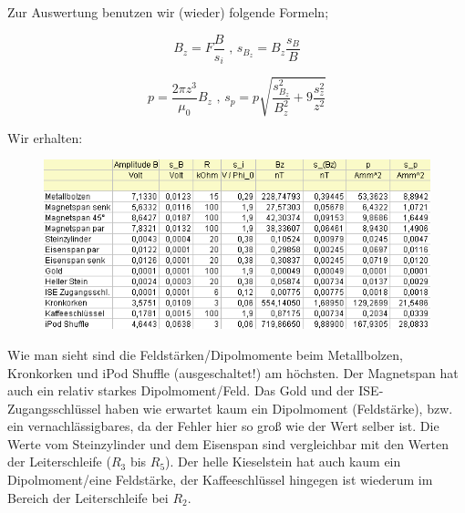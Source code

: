 Zur Auswertung benutzen wir (wieder) folgende Formeln;

$$ B_z = F\frac{B}{s_i} \text{ \ \ , \ \ } s_{B_z} = B_z\frac{s_B}{B}$$

$$ p = \frac{2\pi z^3}{\mu_0}B_z \text{ \ \ , \ \ } s_p = p\sqrt{\frac{s_{B_z}^2}{B_z^2} + 9\frac{s_z^2}{z^2}} $$

Wir erhalten:

\begin{figure}[H]
	\centering \includegraphics[width=\textwidth]{Bilder/Tab-Proben.png}
\end{figure}

Wie man sieht sind die Feldstärken/Dipolmomente beim Metallbolzen, Kronkorken und iPod Shuffle (ausgeschaltet!) am höchsten. Der Magnetspan hat auch ein relativ starkes Dipolmoment/Feld. Das Gold und der ISE-Zugangsschlüssel haben wie erwartet kaum ein Dipolmoment (Feldstärke), bzw. ein vernachlässigbares, da der Fehler hier so groß wie der Wert selber ist. Die Werte vom Steinzylinder und dem Eisenspan sind vergleichbar mit den Werten der Leiterschleife ($R_3$ bis $R_5$). Der helle Kieselstein hat auch kaum ein Dipolmoment/eine Feldstärke, der Kaffeeschlüssel hingegen ist wiederum im Bereich der Leiterschleife bei $R_2$.















